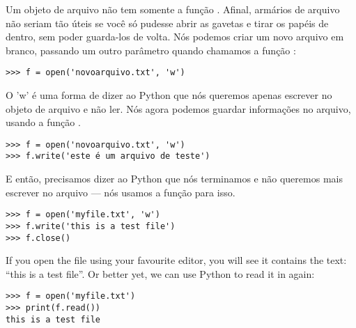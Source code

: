 Um objeto de arquivo não tem somente a função . Afinal, armários de arquivo não seriam tão úteis se você só pudesse abrir as gavetas e tirar os papéis de dentro, sem poder guarda-los de volta. Nós podemos criar um novo arquivo em branco, passando um outro parâmetro quando chamamos a função :

\begin{listing}
\begin{verbatim}
>>> f = open('novoarquivo.txt', 'w')
\end{verbatim}
\end{listing}

O 'w' é uma forma de dizer ao Python que nós queremos apenas escrever no objeto de arquivo e não ler. Nós agora podemos guardar informações no arquivo, usando a função .

\begin{listing}
\begin{verbatim}
>>> f = open('novoarquivo.txt', 'w')
>>> f.write('este é um arquivo de teste')
\end{verbatim}
\end{listing}

E então, precisamos dizer ao Python que nós terminamos e não queremos mais escrever no arquivo --- nós usamos a função  para isso.

\begin{listing}
\begin{verbatim}
>>> f = open('myfile.txt', 'w')
>>> f.write('this is a test file')
>>> f.close()
\end{verbatim}
\end{listing}

If you open the file using your favourite editor, you will see it contains the text: ``this is a test file''.  Or better yet, we can use Python to read it in again:

\begin{listing}
\begin{verbatim}
>>> f = open('myfile.txt')
>>> print(f.read())
this is a test file
\end{verbatim}
\end{listing}

\newpage
